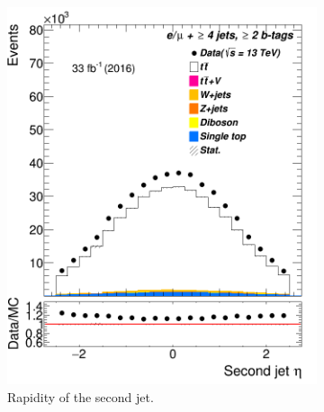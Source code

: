 \begin{figure}
\begin{subfigure}{0.25\textwidth}
	\includegraphics[width=\linewidth]{ControlPlots_emujets_2016_4incl_2incl/jet1_eta_emujets_2016.png}
	\caption{Rapidity of the second jet.} \label{fig:c3}
\end{subfigure}\hspace*{1.0cm}
\begin{subfigure}{0.25\textwidth}

\end{subfigure}
\end{figure}
